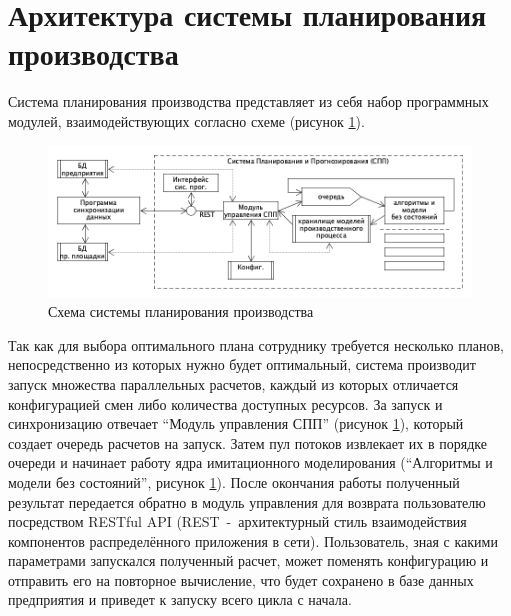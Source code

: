 \section{Архитектура системы планирования производства}
\indent Система планирования производства представляет из себя набор программных модулей, взаимодействующих согласно схеме (рисунок \ref{fig:archSPP}).

\begin{figure}[ht]
	\centering
	\includegraphics[width=\linewidth]{pics/archSPP.png}
	\caption{Схема системы планирования производства \cite{niorkpz}}
	\label{fig:archSPP}
\end{figure}

\indent Так как для выбора оптимального плана сотруднику требуется несколько планов, непосредственно из которых нужно будет оптимальный, система производит запуск множества параллельных расчетов, каждый из которых отличается конфигурацией смен либо количества доступных ресурсов.
За запуск и синхронизацию отвечает ``Модуль управления СПП'' (рисунок \ref{fig:archSPP}), который создает очередь расчетов на запуск.
Затем пул потоков извлекает их в порядке очереди и начинает работу ядра имитационного моделирования (``Алгоритмы и модели без состояний'', рисунок \ref{fig:archSPP}).
После окончания работы полученный результат передается обратно в модуль управления для возврата пользователю посредством RESTful API (REST~-~архитектурный стиль взаимодействия компонентов распределённого приложения в сети).
Пользователь, зная с какими параметрами запускался полученный расчет, может поменять конфигурацию и отправить его на повторное вычисление, что будет сохранено в базе данных предприятия и приведет к запуску всего цикла с начала.